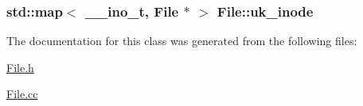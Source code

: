 \subsubsection[{\texorpdfstring{uk\+\_\+inode}{uk_inode}}]{\setlength{\rightskip}{0pt plus 5cm}std\+::map$<$ \+\_\+\+\_\+ino\+\_\+t, {\bf File} $\ast$ $>$ File\+::uk\+\_\+inode\hspace{0.3cm}{\ttfamily [static]}}\hypertarget{class_file_a32733129d25971738ccba2122b0b91a5}{}\label{class_file_a32733129d25971738ccba2122b0b91a5}


The documentation for this class was generated from the following files\+:\begin{DoxyCompactItemize}
\item 
\hyperlink{_file_8h}{File.\+h}\item 
\hyperlink{_file_8cc}{File.\+cc}\end{DoxyCompactItemize}
